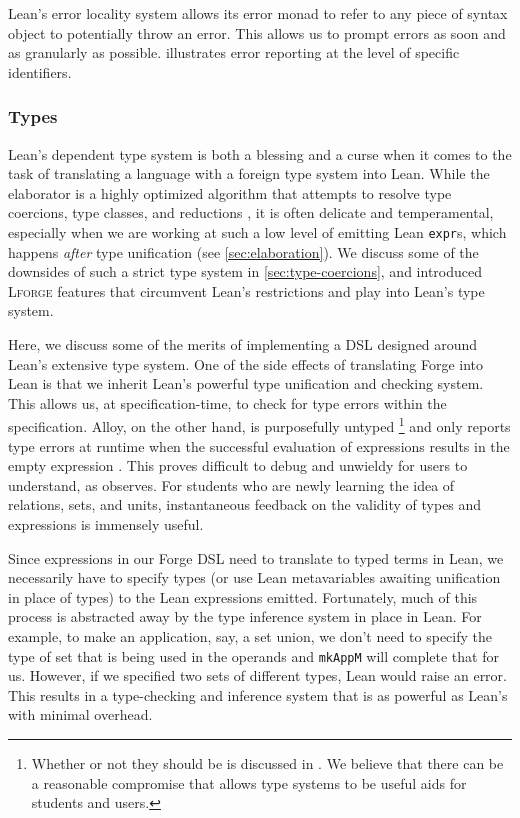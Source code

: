 Lean's error locality system allows its error monad to refer to any piece of syntax object to potentially throw an error. This allows us to prompt errors as soon and as granularly as possible.  illustrates error reporting at the level of specific identifiers. 

\subsubsection{Types}

Lean's dependent type system is both a blessing and a curse when it comes to the task of translating a language with a foreign type system into Lean. While the elaborator is a highly optimized algorithm that attempts to resolve type coercions, type classes, and reductions \cite{de2015lean}, it is often delicate and temperamental, especially when we are working at such a low level of emitting Lean \texttt{expr}s, which happens \emph{after} type unification (see \cref{sec:elaboration}). We discuss some of the downsides of such a strict type system in \cref{sec:type-coercions}, and introduced \textsc{Lforge} features that circumvent Lean's restrictions and play into Lean's type system. 

Here, we discuss some of the merits of implementing a DSL designed around Lean's extensive type system. One of the side effects of translating Forge into Lean is that we inherit Lean's powerful type unification and checking system. This allows us, at specification-time, to check for type errors within the specification. Alloy, on the other hand, is purposefully untyped \cite{jackson2019alloy}\footnote{Whether or not they should be is discussed in \cite{lamport1999should}. We believe that there can be a reasonable compromise that allows type systems to be useful aids for students and users. } and only reports type errors at runtime when the successful evaluation of expressions results in the empty expression \cite{edwards2004type}. This proves difficult to debug and unwieldy for users to understand, as \cite{ngpdbccdlrrvwwk-oopsla-2024} observes. For students who are newly learning the idea of relations, sets, and units, instantaneous feedback on the validity of types and expressions is immensely useful. 

Since expressions in our Forge DSL need to translate to typed terms in Lean, we necessarily have to specify types (or use Lean metavariables awaiting unification in place of types) to the Lean expressions emitted. Fortunately, much of this process is abstracted away by the type inference system in place in Lean. For example, to make an application, say, a set union, we don't need to specify the type of set that is being used in the operands and \texttt{mkAppM} will complete that for us. However, if we specified two sets of different types, Lean would raise an error. This results in a type-checking and inference system that is as powerful as Lean's with minimal overhead. 

